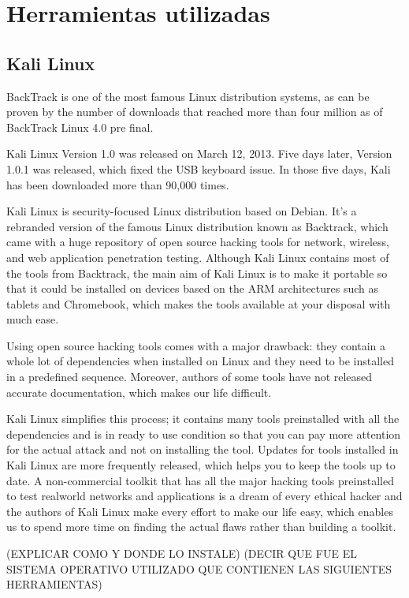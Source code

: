 \section{Herramientas utilizadas}
    \subsection{Kali Linux}
    BackTrack is one of the most famous Linux distribution systems, as can be proven by
the number of downloads that reached more than four million as of BackTrack Linux
4.0 pre final.

Kali Linux Version 1.0 was released on March 12, 2013. Five days later, Version 1.0.1
was released, which fixed the USB keyboard issue. In those five days, Kali has been
downloaded more than 90,000 times.

    Kali Linux is security-focused Linux distribution based on Debian. It's a rebranded
    version of the famous Linux distribution known as Backtrack, which came with
    a huge repository of open source hacking tools for network, wireless, and web
    application penetration testing. Although Kali Linux contains most of the tools
    from Backtrack, the main aim of Kali Linux is to make it portable so that it could
    be installed on devices based on the ARM architectures such as tablets and
    Chromebook, which makes the tools available at your disposal with much ease.

    Using open source hacking tools comes with a major drawback: they contain a
whole lot of dependencies when installed on Linux and they need to be installed in
a predefined sequence. Moreover, authors of some tools have not released accurate
documentation, which makes our life difficult.

Kali Linux simplifies this process; it contains many tools preinstalled with all the
dependencies and is in ready to use condition so that you can pay more attention
for the actual attack and not on installing the tool. Updates for tools installed in Kali
Linux are more frequently released, which helps you to keep the tools up to date. A
non-commercial toolkit that has all the major hacking tools preinstalled to test realworld networks and applications is a dream of every ethical hacker and the authors
of Kali Linux make every effort to make our life easy, which enables us to spend
more time on finding the actual flaws rather than building a toolkit.

(EXPLICAR COMO Y DONDE LO INSTALE)
(DECIR QUE FUE EL SISTEMA OPERATIVO UTILIZADO QUE CONTIENEN LAS SIGUIENTES HERRAMIENTAS)
